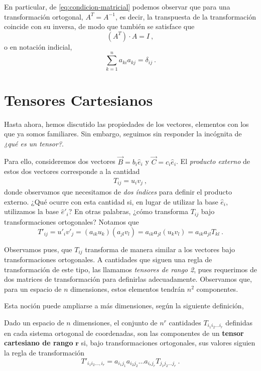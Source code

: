 En particular, de \eqref{eq:condicion-matricial} podemos observar que para una transformación ortogonal, $A^T = A^{-1}$, es decir, la transpuesta de la transformación coincide con su inversa, de modo que también se satisface que
\begin{equation}
    (A^T) \cdot A = I \ ,
\end{equation}
o en notación indicial,
\begin{equation}
    \sum_{k=1}^n a_{ki} a_{kj} =  \delta_{ij} \ .
\end{equation}

\section{Tensores Cartesianos}

Hasta ahora, hemos discutido las propiedades de los vectores, elementos con los que ya somos familiares. Sin embargo, seguimos sin responder la incógnita de \emph{¿qué es un tensor?}.

Para ello, consideremos dos vectores $\vec{B} = b_i \hat{e}_i$ y $\vec{C} = c_i \hat{e}_i$. El \emph{producto externo} de estos dos vectores corresponde a la cantidad
\begin{eqnarray}
    T_{ij} = u_i v_j \ ,
\end{eqnarray}
donde observamos que necesitamos de \emph{dos índices} para definir el producto externo. ¿Qué ocurre con esta cantidad si, en lugar de utilizar la base $\hat{e}_i$, utilizamos la base $\hat{e}'_i$? En otras palabras, ¿cómo transforma $T_{ij}$ bajo transformaciones ortogonales? Notamos que
\begin{equation}
    T'_{ij} = u'_i v'_j = (a_{ik}u_k)(a_{jl} v_l) = a_{ik} a_{jl} (u_k v_l) =  a_{ik} a_{jl} T_{kl} \ .
\end{equation}

Observamos pues, que $T_{ij}$ transforma de manera similar a los vectores bajo transformaciones ortogonales. A cantidades que siguen una regla de transformación de este tipo, las llamamos \emph{tensores de rango 2}, pues requerimos de dos matrices de transformación para definirlas adecuadamente. Observamos que, para un espacio de $n$ dimensiones, estos elementos tendrán $n^2$ componentes.

Esta noción puede ampliarse a más dimensiones, según la siguiente definición,
\begin{defi}
    Dado un espacio de $n$ dimensiones, el conjunto de $n^r$ cantidades $T_{i_1 i_2 \dots i_r}$ definidas en cada sistema ortogonal de coordenadas, son las componentes de un \textbf{tensor cartesiano de rango} $\mathbf{r}$ si, bajo transformaciones ortogonales, sus valores siguien la regla de transformación
    \begin{equation}
        T'_{i_1 i_2 \dots, i_r} = a_{i_1 j_1} a_{i_2 j_2} \dots a_{i_r j_r} T_{j_1 j_2 \dots j_r} \ . 
    \end{equation}
\end{defi}

